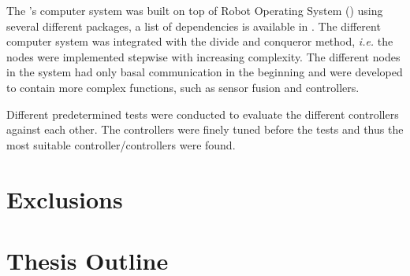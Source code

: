 The \abbrROV's computer system was built on top of Robot Operating System (\abbrROS) using several different packages, a list of dependencies is available in . The different computer system was integrated with the divide and conqueror method, \textit{i.e.} the nodes were implemented stepwise with increasing complexity. The different nodes in the system had only basal communication in the beginning and were developed to contain more complex functions, such as sensor fusion and controllers. 

Different predetermined tests were conducted to evaluate the different controllers against each other. The controllers were finely tuned before the tests and thus the most suitable controller/controllers were found.


\section{Exclusions}
\section{Thesis Outline}

